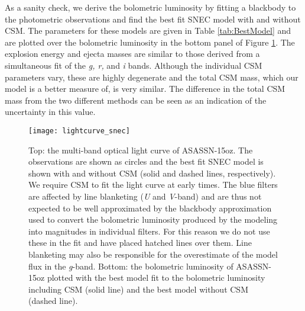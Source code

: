 \documentclass[a4paper,fleqn,usenatbib]{mnras}
\begin{document}
As a sanity check, we derive the bolometric luminosity by fitting a blackbody to the photometric observations and find the best fit SNEC model with and without CSM. 
The parameters for these models are given in Table \ref{tab:BestModel} and are plotted over the bolometric luminosity in the bottom panel of Figure \ref{fig:snecLC}.
The explosion energy and ejecta masses are similar to those derived from a simultaneous fit of the {\it g, r,} and {\it i} bands. 
Although the individual CSM parameters vary, these are highly degenerate and the total CSM mass, which our model is a better measure of, is very similar.
The difference in the total CSM mass from the two different methods can be seen as an indication of the uncertainty in this value. 
\begin{figure}
\begin{center}
\texttt{[image: lightcurve\_snec]} %
\caption{Top: the multi-band optical light curve of ASASSN-15oz. 
The observations are shown as circles and the best fit SNEC model is shown with and without CSM (solid and dashed lines, respectively).
We require CSM to fit the light curve at early times. 
The blue filters are affected by line blanketing ({\it U} and {\it V}-band) and are thus not expected to be well approximated by the blackbody approximation used to convert the bolometric luminosity produced by the modeling into magnitudes in individual filters. 
For this reason we do not use these in the fit and have placed hatched lines over them.
Line blanketing may also be responsible for the overestimate of the model flux in the {\it g}-band.
Bottom: the bolometric luminosity of ASASSN-15oz plotted with the best model fit to the bolometric luminosity including CSM (solid line) and the best model without CSM (dashed line).}
\label{fig:snecLC}
\end{center}
\end{figure}
\end{document}
